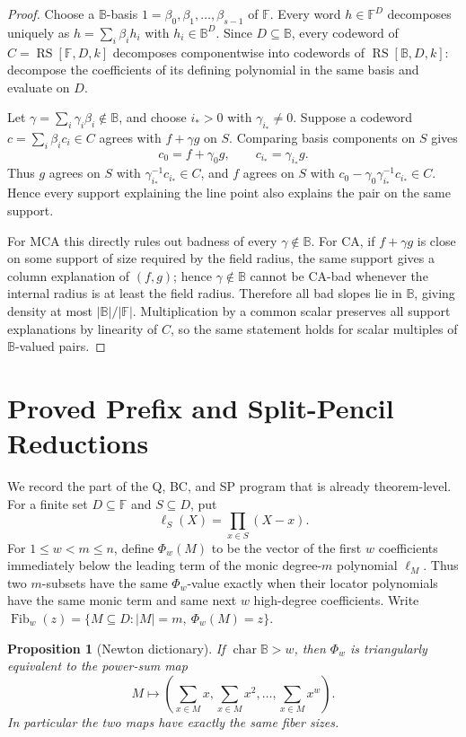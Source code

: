 \documentclass[a4paper,11pt]{amsart}
\newtheorem{proposition}[theorem]{Proposition}
\theoremstyle{remark}
\newcommand{\F}{\mathbb F}
\newcommand{\B}{\mathbb B}
\newcommand{\RS}{\operatorname{RS}}
\newcommand{\Fib}{\operatorname{Fib}}
\begin{document}
\begin{proof}
Choose a \(\B\)-basis \(1=\beta_0,\beta_1,\ldots,\beta_{s-1}\) of \(\F\).  Every word \(h\in\F^D\) decomposes uniquely as \(h=\sum_i\beta_i h_i\) with \(h_i\in\B^D\).  Since \(D\subseteq\B\), every codeword of \(C=\RS[\F,D,k]\) decomposes componentwise into codewords of \(\RS[\B,D,k]\): decompose the coefficients of its defining polynomial in the same basis and evaluate on \(D\).

Let \(\gamma=\sum_i\gamma_i\beta_i\notin\B\), and choose \(i_*>0\) with \(\gamma_{i_*}\ne0\).  Suppose a codeword \(c=\sum_i\beta_i c_i\in C\) agrees with \(f+\gamma g\) on \(S\).  Comparing basis components on \(S\) gives
\[
        c_0=f+\gamma_0 g,\qquad
        c_{i_*}=\gamma_{i_*}g .
\]
Thus \(g\) agrees on \(S\) with \(\gamma_{i_*}^{-1}c_{i_*}\in C\), and \(f\) agrees on \(S\) with \(c_0-\gamma_0\gamma_{i_*}^{-1}c_{i_*}\in C\).  Hence every support explaining the line point also explains the pair on the same support.

For MCA this directly rules out badness of every \(\gamma\notin\B\).  For CA, if \(f+\gamma g\) is close on some support of size required by the field radius, the same support gives a column explanation of \((f,g)\); hence \(\gamma\notin\B\) cannot be CA-bad whenever the internal radius is at least the field radius.  Therefore all bad slopes lie in \(\B\), giving density at most \(|\B|/|\F|\).  Multiplication by a common scalar preserves all support explanations by linearity of \(C\), so the same statement holds for scalar multiples of \(\B\)-valued pairs.
\end{proof}

\section{Proved Prefix and Split-Pencil Reductions}

We record the part of the Q, BC, and SP program that is already theorem-level.  For a finite set \(D\subseteq\F\) and \(S\subseteq D\), put
\[
        \ell_S(X)=\prod_{x\in S}(X-x).
\]
For \(1\le w<m\le n\), define \(\Phi_w(M)\) to be the vector of the first \(w\) coefficients immediately below the leading term of the monic degree-\(m\) polynomial \(\ell_M\).  Thus two \(m\)-subsets have the same \(\Phi_w\)-value exactly when their locator polynomials have the same monic term and same next \(w\) high-degree coefficients.  Write \(\Fib_w(z)=\{M\subseteq D: |M|=m,\ \Phi_w(M)=z\}\).

\begin{proposition}[Newton dictionary]\label{prop:newton}
If \(\operatorname{char}\B>w\), then \(\Phi_w\) is triangularly equivalent to the power-sum map
\[
        M\longmapsto \left(\sum_{x\in M}x,\sum_{x\in M}x^2,\ldots,\sum_{x\in M}x^w\right).
\]
In particular the two maps have exactly the same fiber sizes.
\end{proposition}
\end{document}
